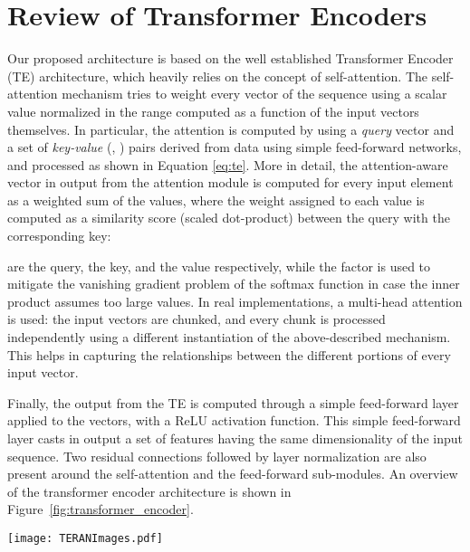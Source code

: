 \documentclass[acmsmall]{acmart}
\newcommand{\majorrevised}[1]{#1}
\begin{document}
\section{Review of Transformer Encoders}
\label{sec:te}
Our proposed architecture is based on the well established Transformer Encoder (TE) architecture, which heavily relies on the concept of self-attention.
The self-attention mechanism tries to weight every vector of the sequence using a scalar value normalized in the range  computed as a function of the input vectors themselves. In particular, the attention is computed by using a \textit{query} vector  and a set of \textit{key-value} (, ) pairs derived from data using simple feed-forward networks, and processed as shown in Equation \ref{eq:te}. More in detail, the attention-aware vector in output from the attention module is computed for every input element as a weighted sum of the values, where the weight assigned to each value is computed as a similarity score (scaled dot-product) between the query with the corresponding key:






 are the query, the key, and the value respectively, while the factor  is used to mitigate the vanishing gradient problem of the softmax function in case the inner product assumes too large values. \majorrevised {In real implementations, a multi-head attention is used: the input vectors are chunked, and every chunk is processed independently using a different instantiation of the above-described mechanism. This helps in capturing the relationships between the different portions of every input vector.}





Finally, the output from the TE is computed through a simple feed-forward layer applied to the  vectors, with a ReLU activation function. This simple feed-forward layer casts in output a set of features having the same dimensionality of the input sequence. Two residual connections followed by layer normalization are also present around the self-attention and the feed-forward sub-modules. \majorrevised{An overview of the transformer encoder architecture is shown in Figure~\ref{fig:transformer_encoder}}.

\begin{figure*}[t]
    \centering
    \texttt{[image: TERANImages.pdf]}
  \caption{\majorrevised{A high-level view of the transformer encoder layer. Every arrow carries  fixed-sized vectors.}}
  \label{fig:transformer_encoder} 
\end{figure*}
\end{document}

